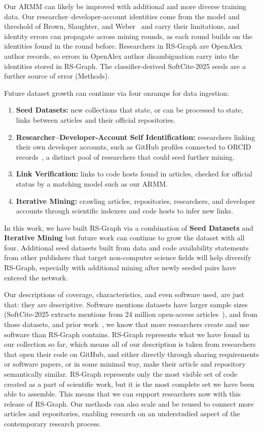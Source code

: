 \documentclass[pdflatex,sn-nature]{sn-jnl}%
\begin{document}
Our ARMM can likely be improved with additional and more diverse training data. Our researcher--developer-account identities come from the model and threshold of Brown, Slaughter, and Weber~\cite{brown2026code} and carry their limitations, and identity errors can propagate across mining rounds, as each round builds on the identities found in the round before. Researchers in RS-Graph are OpenAlex author records, so errors in OpenAlex author disambiguation carry into the identities stored in RS-Graph. The classifier-derived SoftCite-2025 seeds are a further source of error (Methods).

Future dataset growth can continue via four onramps for data ingestion:

\begin{enumerate}
\item \textbf{Seed Datasets:} new collections that state, or can be processed to state, links between articles and their official repositories.
\item \textbf{Researcher--Developer-Account Self Identification:} researchers linking their own developer accounts, such as GitHub profiles connected to ORCID records~\cite{github2024orcid,orcid_github_mou}, a distinct pool of researchers that could seed further mining.
\item \textbf{Link Verification:} links to code hosts found in articles, checked for official status by a matching model such as our ARMM.
\item \textbf{Iterative Mining:} crawling articles, repositories, researchers, and developer accounts through scientific indexers and code hosts to infer new links.
\end{enumerate}

In this work, we have built RS-Graph via a combination of \textbf{Seed Datasets} and \textbf{Iterative Mining} but future work can continue to grow the dataset with all four. Additional seed datasets built from data and code availability statements from other publishers that target non-computer science fields will help diversify RS-Graph, especially with additional mining after newly seeded pairs have entered the network.

Our descriptions of coverage, characteristics, and even software used, are just that: they are descriptive. Software mentions datasets have larger sample sizes (SoftCite-2025 extracts mentions from 24 million open-access articles~\cite{howison_2025_15149379}), and from those datasets, and prior work~\cite{hannay2009scientists}, we know that more researchers create and use software than RS-Graph contains. RS-Graph represents what we have found in our collection so far, which means all of our description is taken from researchers that open their code on GitHub, and either directly through sharing requirements or software papers, or in some minimal way, make their article and repository semantically similar. RS-Graph represents only the most visible set of code created as a part of scientific work, but it is the most complete set we have been able to assemble. This means that we can support researchers now with this release of RS-Graph. Our methods can also scale and be reused to connect more articles and repositories, enabling research on an understudied aspect of the contemporary research process.
\end{document}
